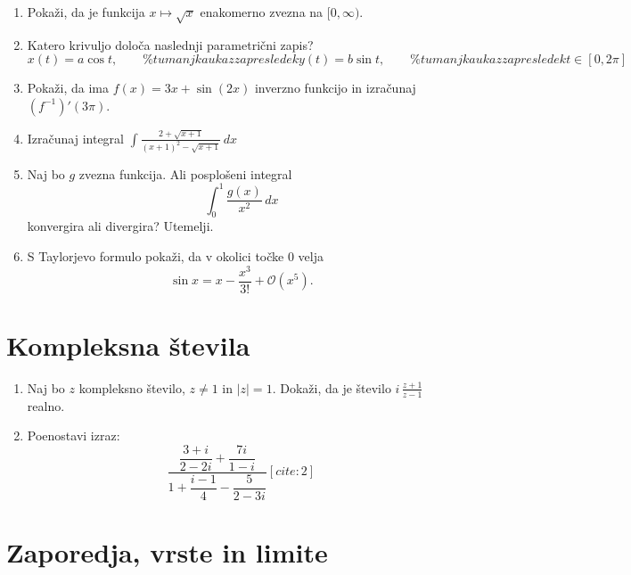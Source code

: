 \documentclass[a4paper,12pt]{article}
\begin{document}
\begin{enumerate}
\item
Pokaži, da je funkcija \(x \mapsto \sqrt{x}\) enakomerno zvezna na \([0, \infty)\).

\item
Katero krivuljo določa naslednji parametrični zapis?
\[x(t) = a \cos t, \qquad \% tu manjka ukaz za presledek y(t) = b \sin t, \qquad \% tu manjka ukaz za presledek t \in [0, 2 \pi]\]

\item
Pokaži, da ima \(f(x) = 3x + \sin(2x)\) inverzno funkcijo in izračunaj \((f^{-1})'(3\pi)\).

\item
Izračunaj integral
\(\displaystyle \int \frac{2+\sqrt{x+1}}{(x+1)^2-\sqrt{x+1}} \, dx\)

\item
Naj bo \(g\) zvezna funkcija. Ali posplošeni integral
\[\int_0^1 \frac{g(x)}{x^2} \, dx\]
konvergira ali divergira? Utemelji.

\item
S Taylorjevo formulo pokaži, da v okolici točke \(0\) velja
\[\sin x = x - \frac{x^3}{3!} + \mathcal{O}(x^5).\]
\end{enumerate}

\section*{Kompleksna števila}

\begin{enumerate}
\item
Naj bo \(z\) kompleksno število, \(z \ne 1\) in \(\vert{}z\vert{} = 1\).
Dokaži, da je število \(i \, \frac{z+1}{z-1}\) realno.

\item
Poenostavi izraz:
\[\frac{\dfrac{3+i}{2-2i} + \dfrac{7i}{1-i}}{1 + \dfrac{i-1}{4} - \dfrac{5}{2-3i}}[cite: 2]\]
\end{enumerate}

\section*{Zaporedja, vrste in limite}
\end{document}
